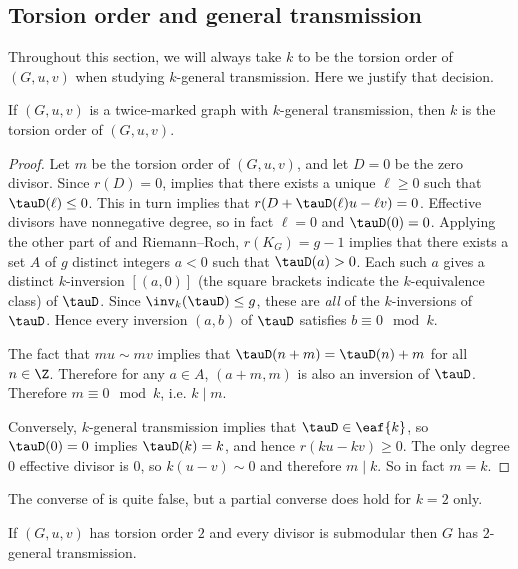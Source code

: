 \subsection{Torsion order and general transmission}

Throughout this section, we will always take $k$ to be the torsion order of $(G,u,v)$ when studying $k$-general transmission. Here we justify that decision.

\begin{lemma} \label{lem:kgtImpliesTorsionOrder}
If $(G,u,v)$ is a twice-marked graph with $k$-general transmission, then $k$ is the torsion order of $(G,u,v)$.
\end{lemma}
\begin{proof}
Let $m$ be the torsion order of $(G,u,v)$, and let $D = 0$ be the zero divisor. Since $r(D) = 0$,  implies that there exists a unique $\ell \geq 0$ such that $\tauD(\ell) \leq 0$. This in turn implies that $r(D + \tauD(\ell) u - \ell v) = 0$. Effective divisors have nonnegative degree, so in fact $\ell = 0$ and $\tauD(0) = 0$. Applying the other part of  and Riemann--Roch, $r(K_G) = g-1$ implies that there exists a set $A$ of $g$ distinct integers $a < 0$ such that $\tauD(a) > 0$. Each such $a$ gives a distinct $k$-inversion $[(a,0)]$ (the square brackets indicate the $k$-equivalence class) of $\tauD$. Since $\inv_k(\tauD) \leq g$, these are \emph{all} of the $k$-inversions of $\tauD$. Hence every inversion $(a,b)$ of $\tauD$ satisfies $b \equiv 0 \mod k$.

The fact that $mu \sim mv$ implies that $\tauD(n + m) = \tauD(n)+m$ for all $n \in \Z$. Therefore for any $a \in A$, $(a+m,m)$ is also an inversion of $\tauD$. Therefore $m \equiv 0 \mod k$, i.e. $k \mid m$.

Conversely, $k$-general transmission implies that $\tauD \in \eaf{k}$, so $\tauD(0) = 0$ implies $\tauD(k) = k$, and hence $r(ku-kv) \geq 0$. The only degree $0$ effective divisor is $0$, so $k(u-v) \sim 0$ and therefore $m \mid k$. So in fact $m = k$.
\end{proof}

The converse of  is quite false, but a partial converse does hold for $k=2$ only.

\begin{lemma}\label{lem-TO2GenTrans}
    If $(G,u,v)$ has torsion order $2$ and every divisor is submodular then $G$ has $2$-general transmission.
\end{lemma}

